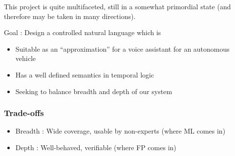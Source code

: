\documentclass{beamer}
\begin{document}





\begin{frame}

\begin{exampleblock}{}
This project is quite multifaceted, still in a somewhat primordial state (and therefore may be taken in many directions).
\end{exampleblock}

\begin{block}{}
Goal : Design a controlled natural language which is 
\end{block}

\begin{itemize}
\item Suitable as an ``approximation'' for a voice assistant for an autonomous vehicle
\item Has a well defined semantics in temporal logic
\item Seeking to balance breadth and depth of our system
\end{itemize}

\end{frame}

\begin{frame}

\frametitle{Trade-offs}

\begin{itemize}
\item Breadth : Wide coverage, usable by non-experts (where ML comes in)
\item Depth   : Well-behaved, verifiable (where FP comes in)
\end{itemize}

\end{frame}
\end{document}
